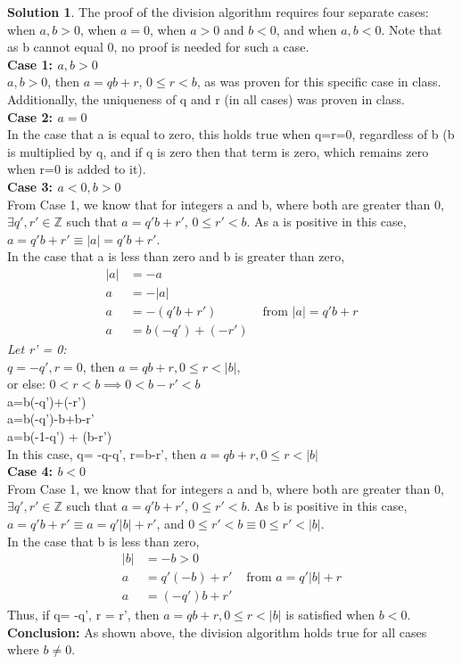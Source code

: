 \documentclass{article}
\theoremstyle{definition}
\newtheorem*{solution}{Solution}
\begin{document}
\begin{solution}

The proof of the division algorithm requires four separate cases: when $a,b>0$, when $a=0$, when $a>0$ and $b<0$, and when $a,b<0$. Note that as b cannot equal 0, no proof is needed for such a case.\\
\textbf{Case 1: $a,b>0$}\\ $a,b>0$, then $a=qb+r$, $0\leq r < b$, as was proven for this specific case in class. Additionally, the uniqueness of q and r (in all cases) was proven in class.\\
\textbf{Case 2: $a=0$}\\In the case that a is equal to zero, this holds true when q=r=0, regardless of b (b is multiplied by q, and if q is zero then that term is zero, which remains zero when r=0 is added to it).\\
\textbf{Case 3: $a<0, b>0$}\\From Case 1, we know that for integers a and b, where both are greater than 0, $\exists q', r' \in \mathbb{Z}$ such that $a=q'b+r'$, $0\leq r' < b$. As a is positive in this case, $a=q'b+r' \equiv |a|=q'b+r'$.\\
In the case that a is less than zero and b is greater than zero,
\begin{align*}
   |a|&=-a \\
   a&=-|a|\\
   a&=-(q'b+r')     &\text{  from } |a|=q'b+r\\
   a&= b(-q') + (-r')
\end{align*}
\textit{Let r' = 0:}\\
$q=-q', r=0$, then $a=qb+r, 0\leq r < |b|$,\\
or else: $0<r<b \implies 0<b-r'<b$\\
a=b(-q')+(-r')\\
a=b(-q')-b+b-r'\\
a=b(-1-q') + (b-r')\\
In this case, q= -q-q', r=b-r', then $a=qb+r, 0\leq r < |b|$\\
\textbf{Case 4: $b<0$}\\
From Case 1, we know that for integers a and b, where both are greater than 0, $\exists q', r' \in \mathbb{Z}$ such that $a=q'b+r'$, $0\leq r' < b$. As b is positive in this case, $a=q'b+r' \equiv a=q'|b|+r'$, and $0\leq r'<b \equiv 0\leq r'<|b|$.\\
In the case that b is less than zero,
\begin{align*}
    |b|&=-b>0\\
    a&=q'(-b)+r'     &\text{  from } a=q'|b|+r\\
    a&=(-q')b+r'
\end{align*}
Thus, if q= -q', r = r', then $a=qb+r, 0\leq r<|b|$ is satisfied when $b<0$.\\ 
\textbf{Conclusion: }As shown above, the division algorithm holds true for all cases where $b\neq 0$.
\end{solution}
\end{document}
